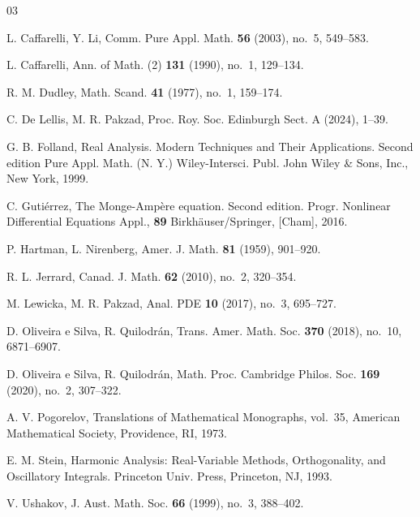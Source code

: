 \documentclass[11pt]{amsart}
\begin{document}
\begin{thebibliography}{03}

 L. Caffarelli, Y. Li,
\newblock Comm. Pure Appl. Math. {\bf 56} (2003), no.~5, 549--583.

 L. Caffarelli,
\newblock Ann. of Math. (2) {\bf 131} (1990), no.~1, 129--134.

 R. M. Dudley, 
\newblock Math. Scand. {\bf 41} (1977), no.~1, 159--174.

 C. De Lellis, M. R. Pakzad,
\newblock Proc. Roy. Soc. Edinburgh Sect. A (2024), 1--39.

 G. B. Folland, 
\newblock Real Analysis.
Modern Techniques and Their Applications. Second edition
\newblock Pure Appl. Math. (N. Y.)
Wiley-Intersci. Publ.
John Wiley \& Sons, Inc., New York, 1999.


 C. Gutiérrez,
\newblock The Monge-Ampère equation.
Second edition. 
\newblock Progr. Nonlinear Differential Equations Appl., {\bf 89}
Birkhäuser/Springer, [Cham], 2016. 

 P. Hartman, L. Nirenberg,
\newblock Amer. J. Math. {\bf 81} (1959), 901--920.

 R. L. Jerrard,
\newblock Canad. J. Math. {\bf 62} (2010), no.~2, 320--354.

 M. Lewicka, M. R. Pakzad,
\newblock Anal. PDE {\bf 10} (2017), no.~3, 695--727.

 D. Oliveira e Silva, R. Quilodrán, 
\newblock Trans. Amer. Math. Soc. {\bf 370} (2018), no.~10, 6871--6907.

 D. Oliveira e Silva, R. Quilodrán, 
\newblock Math. Proc. Cambridge Philos. Soc.   {\bf 169} (2020), no.~2, 307--322.

 A. V. Pogorelov,
\newblock Translations of Mathematical Monographs, vol.~35,
American Mathematical Society, Providence, RI, 1973.




 E. M. Stein,
\newblock Harmonic Analysis: Real-Variable Methods, Orthogonality, and Oscillatory Integrals.
\newblock Princeton Univ. Press, Princeton, NJ, 1993.

 V. Ushakov,
\newblock J. Aust. Math. Soc. {\bf 66} (1999), no.~3, 388--402.
\end{thebibliography}
\end{document}
